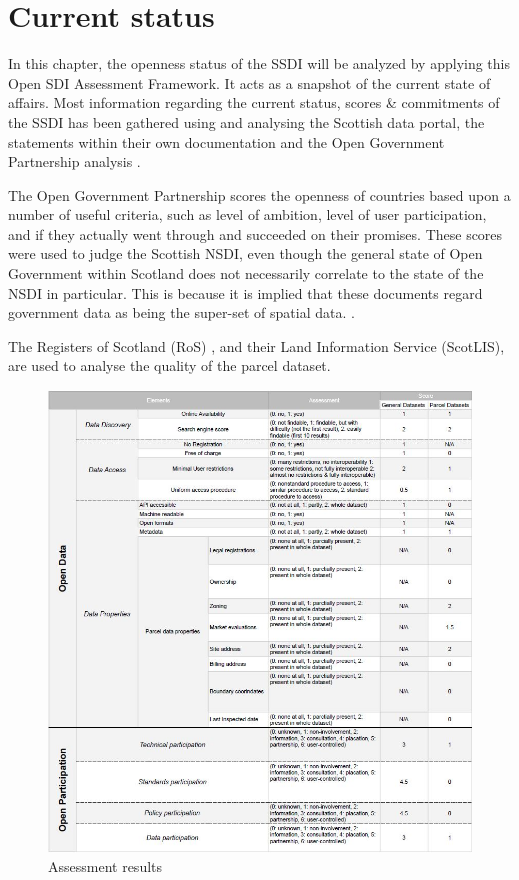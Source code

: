 \section{Current status}

In this chapter, the openness status of the SSDI will be analyzed by applying this Open SDI Assessment Framework. It acts as a snapshot of the current state of affairs. Most information regarding the current status, scores \& commitments of the SSDI has been gathered using and analysing the Scottish data portal, the statements within their own documentation and the Open Government Partnership analysis 
\citep{ssdi,ssdi_documentation,opengovpartnership_mainpage}.

The Open Government Partnership scores the openness of countries based upon a number of useful criteria, such as level of ambition, level of user participation, and if they actually went through and succeeded on their promises. These scores were used to judge the Scottish NSDI, even though the general state of Open Government within Scotland does not necessarily correlate to the state of the NSDI in particular. This is because it is implied that these documents regard government data as being the super-set of spatial data. \citep{opengovpartnership_increasing_participation, opengovpartnership_openpolicymaking}.

The Registers of Scotland (RoS) \citep{ros}, and their Land Information Service (ScotLIS), are used to analyse the quality of the parcel dataset. 

\begin{figure}
    \hspace*{-3cm}
    \graphicspath{ {images/} }
    \includegraphics[width=20cm]{images/assessment_framework_assessment.JPG}
    \caption{Assessment results}
    \label{fig:assesment_result}
\end{figure}

